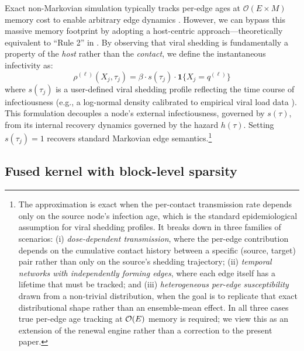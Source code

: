 Exact non-Markovian simulation typically tracks per-edge ages at $\mathcal{O}(E \times M)$ memory cost to enable arbitrary edge dynamics \citep{boguna2014simulating}. However, we can bypass this massive memory footprint by adopting a host-centric approach—theoretically equivalent to ``Rule 2'' in \citet{boguna2014simulating}. By observing that viral shedding is fundamentally a property of the \emph{host} rather than the \emph{contact}, we define the instantaneous infectivity as:
\begin{equation}
    \rho^{(\ell)}(X_j, \tau_j) = \beta \cdot s(\tau_j) \cdot \mathbf{1}\{X_j = q^{(\ell)}\}
    \label{eq:infectivity}
\end{equation}
where $s(\tau_j)$ is a user-defined viral shedding profile reflecting the time course of infectiousness (e.g., a log-normal density calibrated to empirical viral load data \citep{he2020temporal}). This formulation decouples a node's external infectiousness, governed by $s(\tau)$, from its internal recovery dynamics governed by the hazard $h(\tau)$. Setting $s(\tau_j) = 1$ recovers standard Markovian edge semantics.\footnote{The approximation is exact when the per-contact transmission rate depends only on the source node's infection age, which is the standard epidemiological assumption for viral shedding profiles. It breaks down in three families of scenarios: (i) \emph{dose-dependent transmission}, where the per-edge contribution depends on the cumulative contact history between a specific (source, target) pair rather than only on the source's shedding trajectory; (ii) \emph{temporal networks with independently forming edges}, where each edge itself has a lifetime that must be tracked; and (iii) \emph{heterogeneous per-edge susceptibility} drawn from a non-trivial distribution, when the goal is to replicate that exact distributional shape rather than an ensemble-mean effect. In all three cases true per-edge age tracking at $\mathcal{O}(E)$ memory is required; we view this as an extension of the renewal engine rather than a correction to the present paper.}

\subsection{Fused kernel with block-level sparsity}
\label{sec:fused_kernel}

